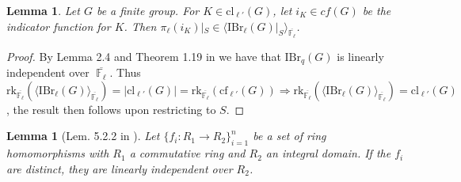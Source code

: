 \documentclass[12pt]{article}
\DeclareMathOperator{\F}{\mathbb{F}}
\theoremstyle{plain}
\newtheorem{lem}[thm]{Lemma}
\theoremstyle{definition}
\begin{document}
\begin{lem}\label{indicator functions in span}
Let $G$ be a finite group. For $K \in \text{cl}_{\ell'}(G)$, let $i_K \in cf(G)$ be the indicator function for $K$. 
Then $\pi_{\ell}(i_K)|_S \in \langle \text{IBr}_{\ell}(G)|_S \rangle_{\overline{\F_{\ell}}}$.
\end{lem}
\begin{proof}
By Lemma 2.4 and Theorem 1.19 in \cite{navarro} we have that $\text{IBr}_q(G)$ is linearly independent over $\overline{\F_{\ell}}$. Thus $\text{rk}_{\overline{\F_{\ell}}}(\langle \text{IBr}_{\ell}(G) \rangle_{\overline{\F_{\ell}}}) = |\text{cl}_{\ell'}(G)| = \text{rk}_{\overline{\F_{\ell}}}(\text{cf}_{\ell'}(G)) \Rightarrow \text{rk}_{\overline{\F_{\ell}}}(\langle \text{IBr}_{\ell}(G) \rangle_{\overline{\F_{\ell}}}) = \text{cl}_{\ell'}(G)$, the result then follows upon restricting to $S$.
\end{proof}
\begin{lem}[Lem. 5.2.2 in \cite{benson}]\label{benson lemma}
Let $\{f_i \colon R_1 \rightarrow R_2\}_{i=1}^n$ be a set of ring homomorphisms with $R_1$ a commutative ring and $R_2$ an integral domain. If the $f_i$ are distinct, they are linearly independent over $R_2$.
\end{lem}
\end{document}
